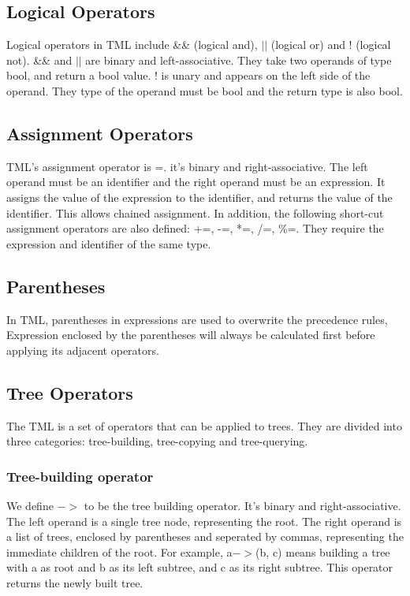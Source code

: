 \documentclass[12pt,psfig,a4]{article}
\begin{document}
\subsection{Logical Operators}
Logical operators in TML include \&\& (logical and), $||$ (logical or) and ! (logical not). \&\& and $||$ are binary and left-associative. They take two operands of type bool, and return a bool value. ! is unary and appears on the left side of the operand. They type of the operand must be bool and the return type is also bool.

\subsection{Assignment Operators}
TML's assignment operator is =. it's binary and right-associative. The left operand must be an identifier and the right operand must be an expression. It assigns the value of the expression to the identifier, and returns the value of the identifier. This allows chained assignment. In addition, the following short-cut assignment operators are also defined: +=, -=, *=, /=, \%=. They require the expression and identifier of the same type.

\subsection{Parentheses}
In TML, parentheses in expressions are used to overwrite the precedence rules, Expression enclosed by the parentheses will always be calculated first before applying its adjacent operators.

\subsection{Tree Operators}
The TML is a set of operators that can be applied to trees. They are divided into three categories: tree-building, tree-copying and tree-querying.

\subsubsection{Tree-building operator}
We define $->$ to be the tree building operator. It's binary and right-associative. The left operand is a single tree node, representing the root. The right operand is a list of trees, enclosed by parentheses and seperated by commas, representing the immediate children of the root. For example, a$->$(b, c) means building a tree with a as root and b as its left subtree, and c as its right subtree. This operator returns the newly built tree.
\end{document}
